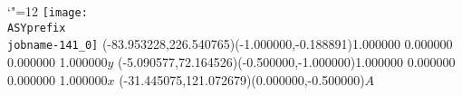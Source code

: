 \setlength{\unitlength}{1pt}%
\makeatletter%
\let\ASYencoding\f@encoding%
\let\ASYfamily\f@family%
\let\ASYseries\f@series%
\let\ASYshape\f@shape%
\makeatother%
{\catcode`"=12%
\texttt{[image: \\ASYprefix\\jobname-141\_0]}%
}%
\color{ASYcolor}%
\fontsize{12.000000}{14.400000}\selectfont%
\usefont{\ASYencoding}{\ASYfamily}{\ASYseries}{\ASYshape}%
\ASYalignT(-83.953228,226.540765)(-1.000000,-0.188891){1.000000 0.000000 0.000000 1.000000}{$y$}%
\color{ASYcolor}%
\fontsize{12.000000}{14.400000}\selectfont%
\ASYalignT(-5.090577,72.164526)(-0.500000,-1.000000){1.000000 0.000000 0.000000 1.000000}{$x$}%
\color{ASYcolor}%
\fontsize{12.000000}{14.400000}\selectfont%
\ASYalign(-31.445075,121.072679)(0.000000,-0.500000){$A$}%
